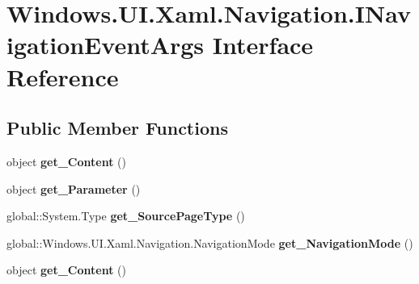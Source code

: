 \hypertarget{interface_windows_1_1_u_i_1_1_xaml_1_1_navigation_1_1_i_navigation_event_args}{}\section{Windows.\+U\+I.\+Xaml.\+Navigation.\+I\+Navigation\+Event\+Args Interface Reference}
\label{interface_windows_1_1_u_i_1_1_xaml_1_1_navigation_1_1_i_navigation_event_args}
\subsection*{Public Member Functions}
\begin{DoxyCompactItemize}
\item 
\mbox{\label{interface_windows_1_1_u_i_1_1_xaml_1_1_navigation_1_1_i_navigation_event_args_a3c11816e887751b9b6b55f442d6a56fb}} 
object {\bfseries get\+\_\+\+Content} ()
\item 
\mbox{\label{interface_windows_1_1_u_i_1_1_xaml_1_1_navigation_1_1_i_navigation_event_args_aee2399db790c7ded1a3d517b16cf1565}} 
object {\bfseries get\+\_\+\+Parameter} ()
\item 
\mbox{\label{interface_windows_1_1_u_i_1_1_xaml_1_1_navigation_1_1_i_navigation_event_args_ac9be56f9222f1792a7cfaec765f29028}} 
global\+::\+System.\+Type {\bfseries get\+\_\+\+Source\+Page\+Type} ()
\item 
\mbox{\label{interface_windows_1_1_u_i_1_1_xaml_1_1_navigation_1_1_i_navigation_event_args_afd6b094e858b9b03320c2320a9b27f6c}} 
global\+::\+Windows.\+U\+I.\+Xaml.\+Navigation.\+Navigation\+Mode {\bfseries get\+\_\+\+Navigation\+Mode} ()
\item 
\mbox{\label{interface_windows_1_1_u_i_1_1_xaml_1_1_navigation_1_1_i_navigation_event_args_a3c11816e887751b9b6b55f442d6a56fb}} 
object {\bfseries get\+\_\+\+Content} ()

\end{DoxyCompactItemize}
